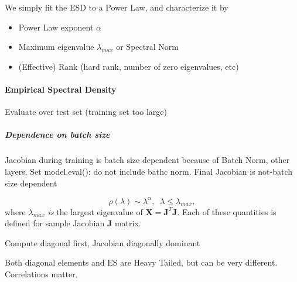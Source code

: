 We simply fit the ESD to a Power Law, and characterize it by 
\begin{itemize}
\item Power Law exponent $\alpha$

\item Maximum eigenvalue $\lambda_{max}$ or Spectral Norm

\item (Effective) Rank (hard rank, number of zero eigenvalues, etc)

\end{itemize}



\paragraph{Empirical Spectral Density}

Evaluate over test set (training set too large)

\subparagraph{Dependence on batch size}
Jacobian during training is batch size dependent because of Batch Norm, other layers.
Set model.eval(): do not include bathc norm.  Final Jacobian is not-batch size dependent


\begin{equation}
\rho(\lambda)\sim\lambda^{\alpha},\;\;\lambda\le\lambda_{max}  ,
\end{equation}
where $\lambda_{max}$ \emph{is} the largest eigenvalue of $\mathbf{X}=\mathbf{J}^{T}\mathbf{J}$.
Each of these quantities is defined for sample Jacobian  $\mathbf{J}$ matrix.


Compute diagonal first,  Jacobian diagonally dominant

Both diagonal elements and ES are Heavy Tailed, but can be very different.
Correlations matter.





